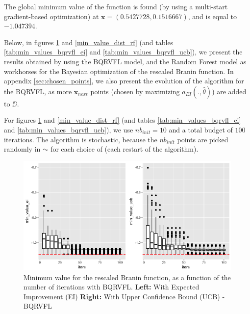 \medskip

The global minimum value of the function is found (by using a multi-start gradient-based optimization) at $\textbf{x} = \left(0.5427728, 0.1516667\right)$, and is equal to $-1.047394$. 

Below, in figures \ref{min_value_dist_bqrvfl} and \ref{min_value_dist_rf} (and tables \ref{tab:min_values_bqrvfl_ei} and \ref{tab:min_values_bqrvfl_ucb}), we present the results obtained by using the BQRVFL model, and the Random Forest model as workhorses for the Bayesian optimization of the rescaled Branin function. In appendix \ref{sec:chosen_points}, we also present the evolution of the algorithm for the BQRVFL, as more $\textbf{x}_{next}$ points (chosen by maximizing $a_{EI}(., \hat{\theta})$) are added to $\DD$. 

For figures \ref{min_value_dist_bqrvfl} and \ref{min_value_dist_rf} (and tables \ref{tab:min_values_bqrvfl_ei} and \ref{tab:min_values_bqrvfl_ucb}), we use $nb_{init} = 10$ and a total budget of $100$ iterations. The algorithm is stochastic, because the $nb_{init}$ points are picked randomly in $\AC$ for each choice of  (each restart of the algorithm).  

\medskip

\begin{figure}[!htb]
\centering
\includegraphics[width=13cm]{gfx/chapter-bayesianrvfl/evol_iter_ei_ucb.png}
\caption{Minimum value for the rescaled Branin function, as a function of the number of iterations with BQRVFL. 
\textbf{Left:} With Expected Improvement (EI) \textbf{Right:} With Upper Confidence Bound (UCB) - BQRVFL}
\label{min_value_dist_bqrvfl}
\end{figure}

